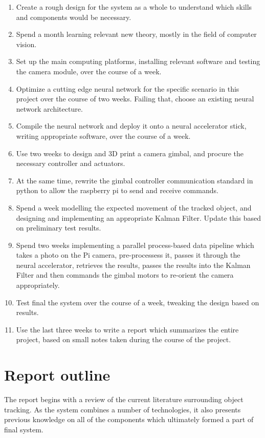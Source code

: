 \begin{enumerate}
\item Create a rough design for the system as a whole to understand which skills and components would be necessary.
\item Spend a month learning relevant new theory, mostly in the field of computer vision.
\item Set up the main computing platforms, installing relevant software and testing the camera module, over the course of a week.
\item Optimize a cutting edge neural network for the specific scenario in this project over the course of two weeks. Failing that, choose an existing neural network architecture.
\item Compile the neural network and deploy it onto a neural accelerator stick, writing appropriate software, over the course of a week.
\item Use two weeks to design and 3D print a camera gimbal, and procure the necessary controller and actuators.
\item At the same time, rewrite the gimbal controller communication standard in python to allow the raspberry pi to send and receive commands.
\item Spend a week modelling the expected movement of the tracked object, and designing and implementing an appropriate Kalman Filter. Update this based on preliminary test results.
\item Spend two weeks implementing a parallel process-based data pipeline which takes a photo on the Pi camera, pre-processess it, passes it through the neural accelerator, retrieves the results, passes the results into the Kalman Filter and then commands the gimbal motors to re-orient the camera appropriately. 
\item Test final the system over the course of a week, tweaking the design based on results.
\item Use the last three weeks to write a report which summarizes the entire project, based on small notes taken during the course of the project.
\end{enumerate}



\section{Report outline}

The report begins with a review of the current literature surrounding object tracking. As the system combines a number of technologies, it also presents previous knowledge on all of the components which ultimately formed a part of final system.


